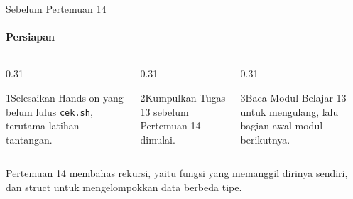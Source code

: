 \documentclass[t]{beamer}
\begin{document}
\begin{frame}{Sebelum Pertemuan 14}
\framesubtitle{Persiapan}
\begin{columns}[T]
\begin{column}{0.31\textwidth}
\begin{Langkah}{1}{Selesaikan}
Hands-on yang belum lulus \texttt{cek.sh}, terutama latihan tantangan.
\end{Langkah}
\end{column}
\begin{column}{0.31\textwidth}
\begin{Langkah}{2}{Kumpulkan}
Tugas 13 sebelum Pertemuan 14 dimulai.
\end{Langkah}
\end{column}
\begin{column}{0.31\textwidth}
\begin{Langkah}{3}{Baca}
Modul Belajar 13 untuk mengulang, lalu bagian awal modul berikutnya.
\end{Langkah}
\end{column}
\end{columns}
\vspace{10pt}
Pertemuan 14 membahas rekursi, yaitu fungsi yang memanggil dirinya sendiri, dan struct untuk mengelompokkan data berbeda tipe.
\end{frame}

\end{document}
